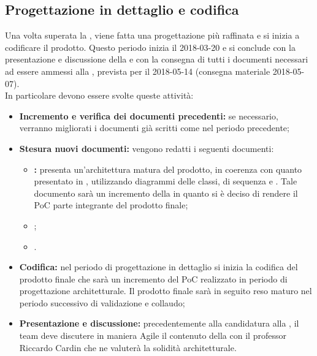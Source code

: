 	\newpage
	
	
	\subsection{Progettazione in dettaglio e codifica}
	\label{pianificazioneProgettazioneDettaglio}
		Una volta superata la \RP{}, viene fatta una progettazione
		più raffinata e si inizia a codificare il prodotto. Questo periodo inizia il 2018-03-20 e si conclude con la 
		presentazione e discussione della \ProductBaseline{} e con la consegna di tutti
		i documenti necessari ad essere ammessi alla \RQ{}, prevista per il 2018-05-14 (consegna materiale 2018-05-07). \\
		In particolare devono essere svolte queste attività:

            \begin{itemize}
                \item \textbf{Incremento e verifica dei documenti precedenti:}
                    se necessario, verranno migliorati i documenti già scritti come
                    nel periodo precedente;
                \item \textbf{Stesura nuovi documenti:}
                    vengono redatti i seguenti documenti:

                    \begin{itemize}
                        \item \textbf{\ProductBaseline{}:}
                            presenta un'architettura matura del prodotto, in coerenza
                            con quanto presentato in \TecnologyBaseline{},
                            utilizzando diagrammi delle classi, di sequenza e
                            . Tale documento sarà un incremento della \TecnologyBaseline{} in
                            quanto si è deciso di rendere il PoC parte integrante del prodotto finale;
                        \item \textbf{\ManualeUtente{}};
                        \item \textbf{\ManualeSviluppatore{}}.
                    \end{itemize}
                \item \textbf{Codifica:}
                	nel periodo di progettazione in dettaglio si inizia la codifica del prodotto finale che sarà
                	un incremento del PoC realizzato in periodo di progettazione architetturale. Il prodotto finale sarà in seguito reso
                	maturo nel periodo successivo di validazione e collaudo;

                \item \textbf{Presentazione e discussione:}
                    precedentemente alla candidatura alla \RQ{},
                    il team deve discutere in maniera Agile il contenuto della
                    \ProductBaseline{} con il professor Riccardo Cardin che ne valuterà la solidità architetturale.
            \end{itemize}
		

